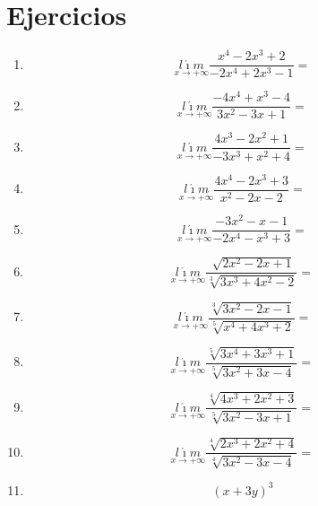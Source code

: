 \documentclass[oneside,spanish,letter]{article}
\begin{document}
\section{Ejercicios}
\begin{enumerate}
 \item $$\underset{x\rightarrow +\infty}{l\acute{\imath}m} \frac{x^4-2x^3+2}{-2x^4+2x^3-1}=$$
 \item $$\underset{x\rightarrow +\infty}{l\acute{\imath}m} \frac{-4x^4+x^3-4}{3x^2-3x+1}=$$
 \item $$\underset{x\rightarrow +\infty}{l\acute{\imath}m} \frac{4x^3-2x^2+1}{-3x^3+x^2+4}=$$
 \item $$\underset{x\rightarrow +\infty}{l\acute{\imath}m} \frac{4x^4-2x^3+3}{x^2-2x-2}=$$
 \item $$\underset{x\rightarrow +\infty}{l\acute{\imath}m} \frac{-3x^2-x-1}{-2x^4-x^3+3}=$$
 \item $$\underset{x\rightarrow +\infty}{l\acute{\imath}m} \frac{\sqrt[]{2x^2-2x+1}}{\sqrt[3]{3x^3+4x^2-2}}=$$
 \item $$\underset{x\rightarrow +\infty}{l\acute{\imath}m} \frac{\sqrt[3]{3x^2-2x-1}}{\sqrt[5]{x^4+4x^3+2}}=$$
 \item $$\underset{x\rightarrow +\infty}{l\acute{\imath}m} \frac{\sqrt[5]{3x^4+3x^3+1}}{\sqrt[5]{3x^2+3x-4}}=$$
 \item $$\underset{x\rightarrow +\infty}{l\acute{\imath}m} \frac{\sqrt[4]{4x^3+2x^2+3}}{\sqrt[5]{3x^2-3x+1}}=$$
 \item $$\underset{x\rightarrow +\infty}{l\acute{\imath}m} \frac{\sqrt[4]{2x^3+2x^2+4}}{\sqrt[4]{3x^2-3x-4}}=$$
\item $$(x+3y)^3$$
 \end{enumerate}
  \newpage
\end{document}
